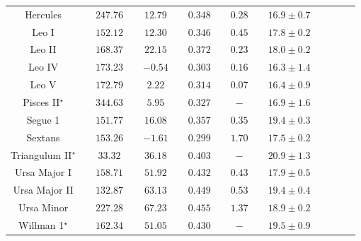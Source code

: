 \documentclass[12pt,aps,prd,amsmath,amssymb,showpacs,floats,floatfix,nofootinbib]{revtex4-1}
\def\red#1{{\textcolor{red}{#1}}} %
\begin{document}
\begin{table}
\begin{tabular}{ccccccccccccccc}
        Hercules&&
		$247.76$&&
		$12.79$&&
		$0.348$&&
		$0.28$&&
		$16.9\pm0.7$\\

        Leo I&&
		$152.12$&&
		$12.30$&&
		$0.346$&&
		$0.45$&&
		$17.8\pm0.2$\\

        Leo II&&
		$168.37$&&
		$22.15$&&
		$0.372$&&
		$0.23$&&
		$18.0\pm0.2$\\

        Leo IV&&
		$173.23$&&
		$-0.54$&&
		$0.303$&&
		$0.16$&&
		$16.3\pm1.4$\\

        Leo V&&
		$172.79$&&
		$2.22$&&
		$0.314$&&
		$0.07$&&
		$16.4\pm0.9$\\

        Pisces II$^{\star}$&&
		$344.63$&&
		$5.95$&&
		$0.327$&&
		$-$&&
		$16.9\pm1.6$\\

        Segue 1&&
		$151.77$&&
		$16.08$&&
		$0.357$&&
		$0.35$&&
		$19.4\pm0.3$\\

        Sextans&&
		$153.26$&&
		$-1.61$&&
		$0.299$&&
		$1.70$&&
		$17.5\pm0.2$\\

        Triangulum II$^{\star}$&&
		$33.32$&&
		$36.18$&&
		$0.403$&&
		$-$&&
		$20.9\pm1.3$\\

        Ursa Major I&&
		$158.71$&&
		$51.92$&&
		$0.432$&&
		$0.43$&&
		$17.9\pm0.5$\\

        Ursa Major II&&
		$132.87$&&
		$63.13$&&
		$0.449$&&
		$0.53$&&
		$19.4\pm0.4$\\

        Ursa Minor&&
		$227.28$&&
		$67.23$&&
		$0.455$&&
		$1.37$&&
		$18.9\pm0.2$\\

        Willman 1$^{\star}$&&
		$162.34$&&
		$51.05$&&
		$0.430$&&
		$-$&&
		$19.5\pm0.9$\\
    \hline\hline
	\end{tabular}
    \end{table}
    
\end{document}
